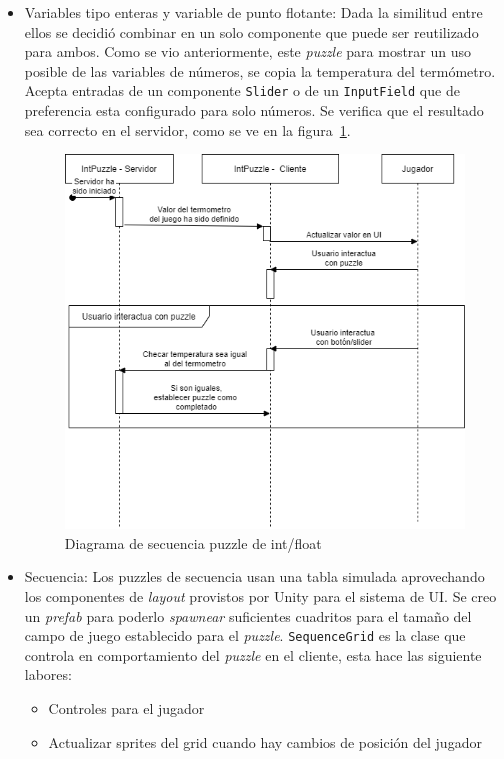 \begin{itemize}
    \item Variables tipo enteras y variable de punto flotante: Dada la similitud entre ellos se decidió combinar en un solo componente que puede ser reutilizado para ambos. Como se vio anteriormente, este \textit{puzzle} para mostrar un uso posible de las variables de números, se copia la temperatura del termómetro. Acepta entradas de un componente \texttt{Slider} o de un \texttt{InputField} que de preferencia esta configurado para solo números. Se verifica que el resultado sea correcto en el servidor, como se ve en la figura~\ref{fig:diagrama_sec_int_float}.
    \begin{figure}[H]
        \centering
        \includegraphics[width=0.8\linewidth]{images/DiagramaSecuenciaPuzzleNumbers.png}
        \caption{Diagrama de secuencia puzzle de int/float}
        \label{fig:diagrama_sec_int_float}
    \end{figure}
    \item Secuencia: Los puzzles de secuencia usan una tabla simulada aprovechando los componentes de \textit{layout} provistos por Unity para el sistema de UI. Se creo un \textit{prefab} para poderlo \textit{spawnear} suficientes cuadritos para el tamaño del campo de juego establecido para el \textit{puzzle}. \texttt{SequenceGrid} es la clase que controla en comportamiento del \textit{puzzle} en el cliente, esta hace las siguiente labores:
    \begin{itemize}
        \item Controles para el jugador
        \item Actualizar sprites del grid cuando hay cambios de posición del jugador

\end{itemize}
\end{itemize}
